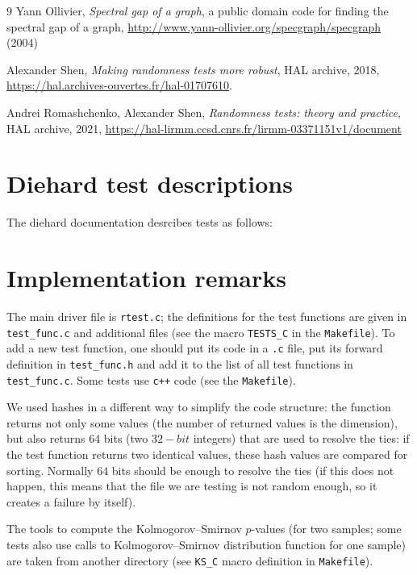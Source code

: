 \documentclass[12pt,a4paper,fullpage]{article}
\begin{document}
\begin{thebibliography}{9}
Yann Ollivier,  \emph{Spectral gap of a graph}, a public domain code for finding the spectral gap of a graph,  \url{http://www.yann-ollivier.org/specgraph/specgraph} (2004)

Alexander Shen, \emph{Making randomness tests more robust}, HAL archive, 2018, \url{https://hal.archives-ouvertes.fr/hal-01707610}.

Andrei Romashchenko, Alexander Shen, \emph{Randomness tests: theory and practice}, HAL archive, 2021, 
\url{https://hal-lirmm.ccsd.cnrs.fr/lirmm-03371151v1/document}

\end{thebibliography}
\appendix

\section{Diehard test descriptions}

The diehard documentation desrcibes tests as follows:
\small



\section{Implementation remarks}

The main driver file is \texttt{rtest.c}; the definitions for the test functions are given in \texttt{test\_func.c} and additional files (see the macro \texttt{TESTS\_C} in the \texttt{Makefile}). To add a new test function, one should put its code in a \texttt{.c} file, put its forward definition in \texttt{test\_func.h} and add it to the list of all test functions in \texttt{test\_func.c}. Some tests use \texttt{c++} code (see the \texttt{Makefile}). 

We used hashes in a different way to simplify the code structure: the function returns not only some values (the number of returned values is the dimension), but also returns $64$ bits (two $32-bit$ integers) that are used to resolve the ties: if the test function returns two identical values, these hash values are compared for sorting. Normally $64$ bits should be enough to resolve the ties (if this does not happen, this means that the file we are testing is not random enough, so it creates a failure by itself).

The tools to compute the Kolmogorov--Smirnov $p$-values (for two samples; some tests also use calls to Kolmogorov--Smirnov distribution function for one sample) are taken from another directory (see \texttt{KS\_C} macro definition in \texttt{Makefile}).
\end{document}
